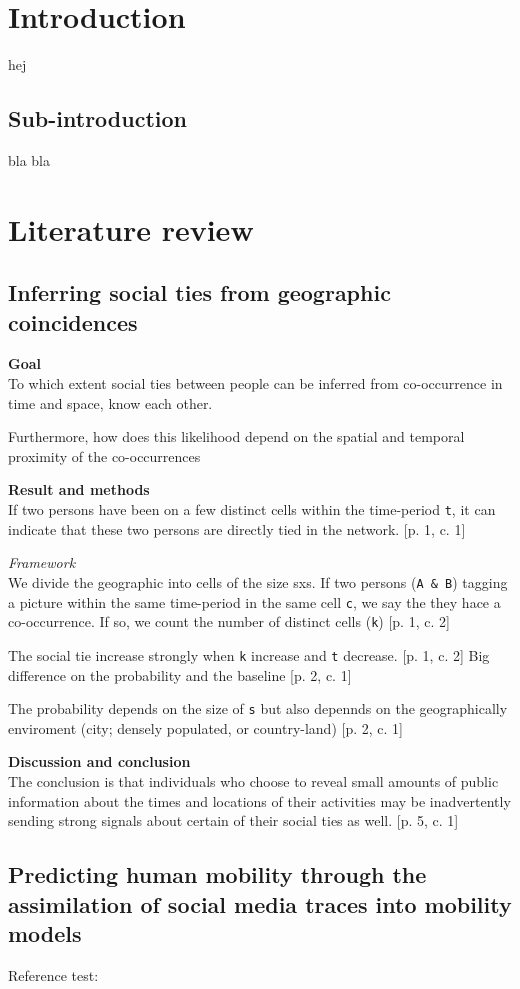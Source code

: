 \section{Introduction}
hej

\subsection{Sub-introduction}
bla bla


\section{Literature review}
\subsection{Inferring social ties from geographic coincidences \cite{ISTfGC}}
\textbf{Goal}\\
To which extent social ties between people can be inferred from co-occurrence in time and space, know each other. 

Furthermore, how does this likelihood depend on the spatial and temporal proximity of the co-occurrences



\textbf{Result and methods}\\
If two persons have been on a few distinct cells within the time-period \texttt{t}, it can indicate that these two persons are directly tied in the network. [p. 1, c. 1]

\textit{Framework}\\
We divide the geographic into cells of the size sxs. 
If two persons (\texttt{A \& B}) tagging a picture within the same time-period in the same cell \texttt{c}, we say the they hace a co-occurrence. If so, we count the number of distinct cells (\texttt{k}) [p. 1, c. 2]


The social tie increase strongly when \texttt{k} increase and \texttt{t} decrease. [p. 1, c. 2]
Big difference on the probability and the baseline [p. 2, c. 1]

The probability depends on the size of \texttt{s} but also depennds on the geographically enviroment (city; densely populated, or country-land) [p. 2, c. 1]


\textbf{Discussion and conclusion}\\
The conclusion is that individuals who choose to reveal small amounts of public information about the times and locations of their activities may be inadvertently sending strong signals about certain of their social ties as well. [p. 5, c. 1]



\subsection{Predicting human mobility through the assimilation of social media traces into mobility models \cite{human_mob_through_assi}}


Reference test: \cite{mrx05}